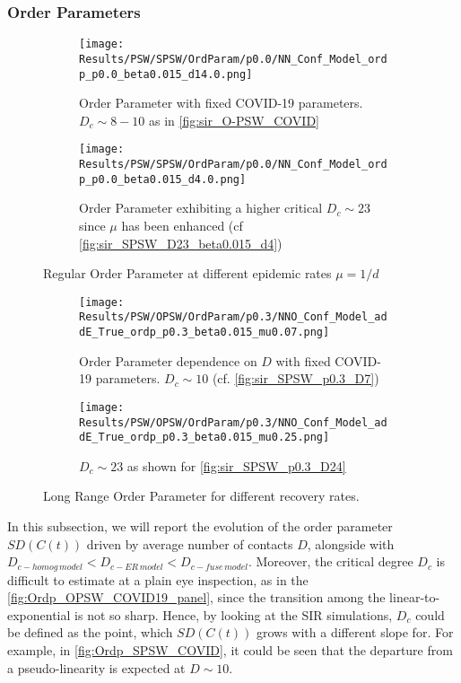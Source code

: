 \documentclass[a4paper,10pt,twoside]{book} %
\theoremstyle{definition}
\begin{document}
\subsubsection*{Order Parameters}
\begin{figure}[ht]
	\begin{subfigure}[t]{0.48\linewidth}
		\centering
		\texttt{[image: Results/PSW/SPSW/OrdParam/p0.0/NN\_Conf\_Model\_ordp\_p0.0\_beta0.015\_d14.0.png]} 
		\caption{Order Parameter with fixed COVID-19 parameters. \newline $D_c \sim 8-10$ as in \autoref{fig:sir_O-PSW_COVID}}
		\label{fig:Ordp_SPSW_COVID-19_d14}
	\end{subfigure}
	\begin{subfigure}[t]{0.48\linewidth}
		\centering
		\texttt{[image: Results/PSW/SPSW/OrdParam/p0.0/NN\_Conf\_Model\_ordp\_p0.0\_beta0.015\_d4.0.png]}
		\caption{Order Parameter exhibiting a higher critical $D_c \sim 23$ since $\mu$ has been enhanced (cf \autoref{fig:sir_SPSW_D23_beta0.015_d4})}
		\label{fig:Ordp_SPSW_d4_COVID19}
	\end{subfigure}
	\caption{Regular Order Parameter at different epidemic rates $\mu = 1/d$}
	\label{fig:Ordp_SPSW_COVID}
\end{figure}

\begin{figure}[ht]
	\begin{subfigure}[t]{0.48\linewidth}
		\texttt{[image: Results/PSW/OPSW/OrdParam/p0.3/NNO\_Conf\_Model\_addE\_True\_ordp\_p0.3\_beta0.015\_mu0.07.png]}
		\caption{Order Parameter dependence on $D$ with fixed COVID-19 parameters. $D_c \sim 10$ \cite{Thurner::NetBasedExpl} (cf. \autoref{fig:sir_SPSW_p0.3_D7})}
		\label{fig:Ordp_SPSW_p0.3}
	\end{subfigure}
	\begin{subfigure}[t]{0.48\linewidth}
		\texttt{[image: Results/PSW/OPSW/OrdParam/p0.3/NNO\_Conf\_Model\_addE\_True\_ordp\_p0.3\_beta0.015\_mu0.25.png]}
		\caption{$D_c \sim 23$ as shown for \autoref{fig:sir_SPSW_p0.3_D24}}
		\label{fig:Ordp_SPSW_d4_p0.3}
	\end{subfigure}
	\caption{Long Range Order Parameter for different recovery rates.}
	\label{fig:Ordp_SPSW_COVID_p0.3}
\end{figure}
In this subsection, we will report the evolution of the order parameter $SD(C(t))$ driven by  average number of contacts $D$, alongside with $D_{c-homog \, model} < D_{c-ER \, model} < D_{c-fuse \, model}$. Moreover, the critical degree $D_c$ is difficult to estimate at a plain eye inspection, as in the \autoref{fig:Ordp_OPSW_COVID19_panel}, since the transition among the linear-to-exponential is not so sharp. Hence, by looking at the SIR simulations, $D_c$ could be defined as the point, which $SD(C(t))$ grows with a different slope for.
For example, in \autoref{fig:Ordp_SPSW_COVID}, it could be seen that the departure from a pseudo-linearity is expected at $D \sim 10$.
\end{document}
